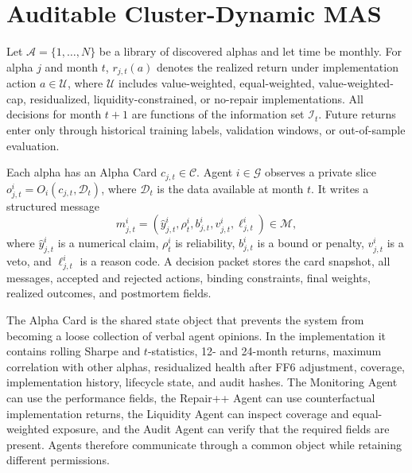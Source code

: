 \documentclass[sigconf,nonacm]{acmart}
\newcommand{\calA}{\mathcal{A}}
\newcommand{\calI}{\mathcal{I}}
\newcommand{\calC}{\mathcal{C}}
\newcommand{\calU}{\mathcal{U}}
\newcommand{\calM}{\mathcal{M}}
\newcommand{\calG}{\mathcal{G}}
\newcommand{\calD}{\mathcal{D}}
\begin{document}
\section{Auditable Cluster-Dynamic MAS}

Let \(\calA=\{1,\ldots,N\}\) be a library of discovered alphas and let time be monthly. For alpha \(j\) and month \(t\), \(r_{j,t}(a)\) denotes the realized return under implementation action \(a\in\calU\), where \(\calU\) includes value-weighted, equal-weighted, value-weighted-cap, residualized, liquidity-constrained, or no-repair implementations. All decisions for month \(t+1\) are functions of the information set \(\calI_t\). Future returns enter only through historical training labels, validation windows, or out-of-sample evaluation.

Each alpha has an Alpha Card \(c_{j,t}\in\calC\). Agent \(i\in\calG\) observes a private slice \(o^i_{j,t}=O_i(c_{j,t},\calD_t)\), where \(\calD_t\) is the data available at month \(t\). It writes a structured message
\begin{equation}
m^i_{j,t}=(\hat y^i_{j,t},\rho^i_t,b^i_{j,t},v^i_{j,t},\ell^i_{j,t})\in\calM ,
\end{equation}
where \(\hat y^i_{j,t}\) is a numerical claim, \(\rho^i_t\) is reliability, \(b^i_{j,t}\) is a bound or penalty, \(v^i_{j,t}\) is a veto, and \(\ell^i_{j,t}\) is a reason code. A decision packet stores the card snapshot, all messages, accepted and rejected actions, binding constraints, final weights, realized outcomes, and postmortem fields.

The Alpha Card is the shared state object that prevents the system from becoming a loose collection of verbal agent opinions. In the implementation it contains rolling Sharpe and \(t\)-statistics, 12- and 24-month returns, maximum correlation with other alphas, residualized health after FF6 adjustment, coverage, implementation history, lifecycle state, and audit hashes. The Monitoring Agent can use the performance fields, the Repair++ Agent can use counterfactual implementation returns, the Liquidity Agent can inspect coverage and equal-weighted exposure, and the Audit Agent can verify that the required fields are present. Agents therefore communicate through a common object while retaining different permissions.
\end{document}
